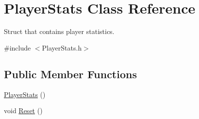 \hypertarget{struct_player_stats}{}\section{Player\+Stats Class Reference}
\label{struct_player_stats}


Struct that contains player statistics.  




{\ttfamily \#include $<$Player\+Stats.\+h$>$}

\subsection*{Public Member Functions}
\begin{DoxyCompactItemize}
\item 
\hyperlink{struct_player_stats_a80dcf207b4271ad8e3e8e3766b52a4eb}{Player\+Stats} ()
\item 
void \hyperlink{struct_player_stats_a142ec7949841369d22ea4d6e7fa78caf}{Reset} ()
\end{DoxyCompactItemize}
